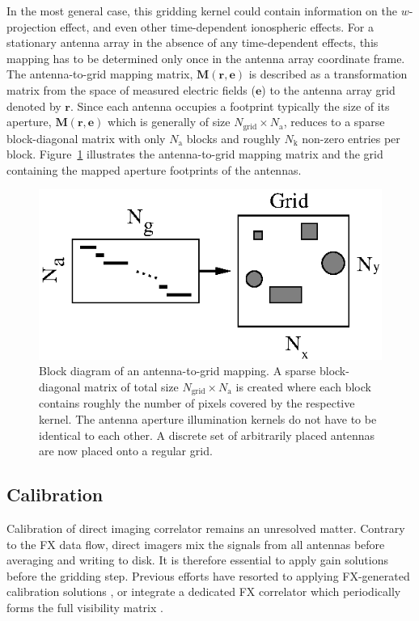 \documentclass[a4paper,fleqn,usenatbib]{../mnras}
\begin{document}
In the most general case, this gridding kernel could contain information on the
$w$-projection effect, and even other time-dependent ionospheric effects. For a
stationary antenna array in the absence of any time-dependent effects, this
mapping has to be determined only once in the antenna array coordinate frame. The
antenna-to-grid mapping matrix, $\mathbf{M}(\mathbf{r},\mathbf{e})$ is described
as a transformation matrix from the space of measured electric fields
($\mathbf{e}$) to the antenna array grid denoted by $\mathbf{r}$. Since each
antenna occupies a footprint typically the size of its aperture,
$\mathbf{M}(\mathbf{r},\mathbf{e})$ which is generally of size
$N_\textrm{grid}\times N_\textrm{a}$, reduces to a sparse block-diagonal matrix
with only $N_\textrm{a}$ blocks and roughly $N_\textrm{k}$ non-zero entries per
block. Figure~\ref{fig:a2g-mapping} illustrates the antenna-to-grid mapping
matrix and the grid containing the mapped aperture footprints of the antennas.

\begin{figure}
  \includegraphics[width=\columnwidth]{a2g_mapping.eps}
  \caption{Block diagram of an antenna-to-grid mapping. A sparse block-diagonal
    matrix of total size $N_\textrm{grid}\times N_\textrm{a}$ is created where each
    block contains roughly the number of pixels covered by the respective kernel.
    The antenna aperture illumination kernels do not have to be identical to each
    other. A discrete set of arbitrarily placed antennas are now placed onto a
    regular grid.}
  \label{fig:a2g-mapping}
\end{figure}

\subsection{Calibration}
Calibration of direct imaging correlator remains an unresolved matter. Contrary
to the FX data flow, direct imagers mix the signals from all antennas before
averaging and writing to disk. It is therefore essential to apply gain solutions 
before the gridding step. Previous efforts have resorted to applying FX-generated
calibration solutions \citep{zhe14, fos14}, or integrate a dedicated FX correlator 
which periodically forms the full visibility matrix \citep{wij09, dev09}. 
\end{document}
